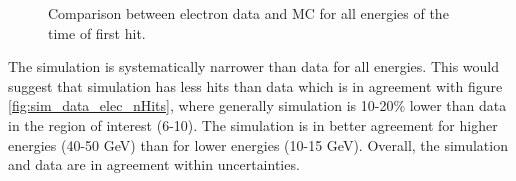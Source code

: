 \documentclass[twoside,a4paper,11pt]{article}
\begin{document}
\begin{figure}[htbp]
	\hfill
	\hfill
	\hfill
	\caption[]{Comparison between electron data and MC for all energies of the time of first hit.}
	\label{fig:sim_data_elec}
\end{figure}
The simulation is systematically narrower than data for all energies. This would suggest that simulation has less hits than data which is in agreement with figure \ref{fig:sim_data_elec_nHits}, where generally simulation is 10-20\% lower than data in the region of interest (6-10). The simulation is in better agreement for higher energies (40-50 GeV) than for lower energies (10-15 GeV). Overall, the simulation and data are in agreement within uncertainties.
\end{document}
